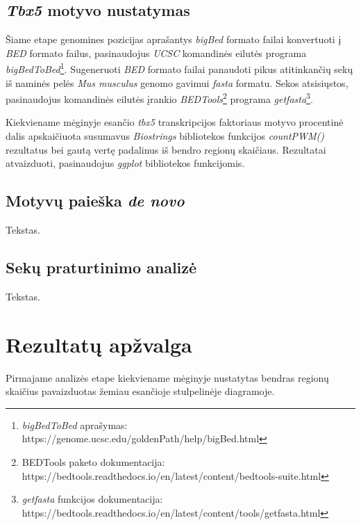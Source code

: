 \documentclass[12pt]{article}
\begin{document}
\subsection{\emph{Tbx5} motyvo nustatymas}
Šiame etape genomines pozicijas aprašantys \emph{bigBed} formato
failai konvertuoti į \emph{BED} formato failus, pasinaudojus
\emph{UCSC} komandinės eilutės programa \emph{bigBedToBed}\footnote[1]
{\emph{bigBedToBed} aprašymas: 
https://genome.ucsc.edu/goldenPath/help/bigBed.html}.
Sugeneruoti \emph{BED} formato failai panaudoti pikus atitinkančių
sekų iš naminės pelės \emph{Mus musculus} genomo gavimui
\emph{fasta} formatu. Sekos atsisiųstos, pasinaudojus komandinės
eilutės įrankio \emph{BEDTools}\footnote[2]{BEDTools paketo
dokumentacija: 
https://bedtools.readthedocs.io/en/latest/content/bedtools-suite.html}
programa \emph{getfasta}\footnote[3]{\emph{getfasta} funkcijos
dokumentacija: 
https://bedtools.readthedocs.io/en/latest/content/tools/getfasta.html}.

Kiekviename mėginyje esančio \emph{tbx5} transkripcijos faktoriaus
motyvo procentinė dalis apskaičiuota susumavus \emph{Biostrings}
bibliotekos funkcijos \emph{countPWM()} rezultatus bei gautą
vertę padalinus iš bendro regionų skaičiaus.
Rezultatai atvaizduoti, pasinaudojus \emph{ggplot} bibliotekos
funkcijomis.

\subsection{Motyvų paieška \emph{de novo}}
Tekstas.

\subsection{Sekų praturtinimo analizė}
Tekstas.

\newpage


\section{Rezultatų apžvalga}
Pirmajame analizės etape kiekviename mėginyje nustatytas bendras
regionų skaičius pavaizduotas žemiau esančioje stulpelinėje
diagramoje.
\end{document}
